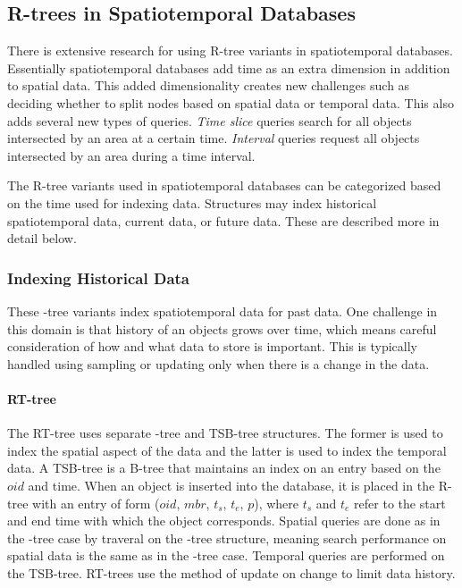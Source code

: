 \subsection{R-trees in Spatiotemporal Databases}
There is extensive research for using R-tree variants in spatiotemporal
databases. Essentially spatiotemporal databases add time as an extra dimension
in addition to spatial data. This added dimensionality creates new challenges
such as deciding whether to split nodes based on spatial data or temporal data. 
This also adds several new types of queries. \emph{Time slice}
queries search for all objects intersected by an area at a certain time. 
\emph{Interval} queries request all objects intersected by an area during a time
interval.

The R-tree variants used in spatiotemporal databases can be categorized based
on the time used for indexing data. Structures may index historical 
spatiotemporal data, current data, or future data. These are described more
in detail below.

\subsubsection{Indexing Historical Data}
These \rbase-tree variants index spatiotemporal data for past data. One challenge
in this domain is that history of an objects grows over time, which means 
careful consideration of how and what data to store is important. This is 
typically handled using sampling or updating only when there is a change in the
data. 

\paragraph{RT-tree} The RT-tree\cite{xu1990rt} uses separate \rbase-tree and 
TSB-tree structures. The former is used 
to index the spatial aspect of the data and the latter is used to index
the temporal data. A TSB-tree is a B-tree that maintains an index on an 
entry based on the $oid$ and time. When an object is inserted into the 
database, it is placed in the R-tree with an entry of form 
($oid$, $mbr$, $t_s$, $t_e$, $p$), where $t_s$ and $t_e$ refer to the 
start and end time with which the object corresponds. Spatial queries 
are done as in the \rbase-tree case by traveral on the \rbase-tree 
structure, meaning search performance on spatial data is the same as in 
the \rbase-tree case. Temporal queries are performed on the TSB-tree. 
RT-trees use the method of update on change to limit data history.

